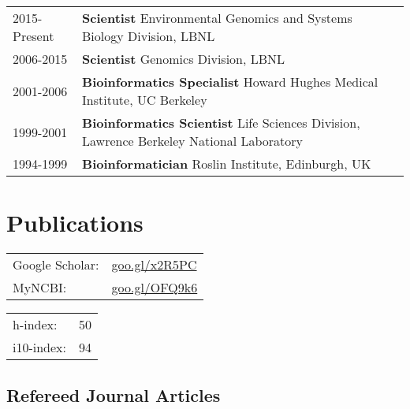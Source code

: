 \documentclass[11pt,fullpage]{article}
\begin{document}

\begin{tabular}{ll}
	2015-Present & {\bf Scientist} Environmental Genomics and Systems Biology Division, LBNL \\
	2006-2015 & {\bf Scientist} Genomics Division, LBNL \\
	2001-2006 & {\bf Bioinformatics Specialist} Howard Hughes Medical Institute, UC Berkeley \\
	1999-2001 & {\bf Bioinformatics Scientist} Life Sciences Division, Lawrence
        Berkeley National Laboratory \\
	1994-1999 & {\bf Bioinformatician} Roslin Institute,
        Edinburgh, UK \\
\end{tabular}

% 
\newcommand{\pinfo}[4]{
  {\bf #1} & \multicolumn{2}{l}{\emph{#2}} \\
  & \underline{\href{http://#3}{#3}} & #4 \\
}


\section*{Publications}

\begin{minipage}{0.50\linewidth}
  \begin{tabular}{ll}
    Google Scholar: & \href{https://goo.gl/x2R5PC}{goo.gl/x2R5PC} \\
    MyNCBI: & \href{http://goo.gl/OFQ9k6}{goo.gl/OFQ9k6} \\
  \end{tabular}  
\end{minipage}
\begin{minipage}{0.50\linewidth}
  \begin{tabular}{ll}
    h-index: & 50 \\
    i10-index: & 94 \\
  \end{tabular}
\end{minipage}


\subsection*{Refereed Journal Articles}
\end{document}
